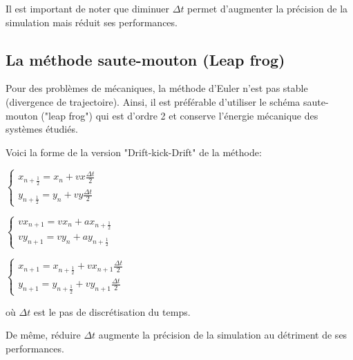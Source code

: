 Il est important de noter que diminuer $\Delta t$ permet d'augmenter la précision de la simulation mais réduit ses performances.

\vspace{2mm}

\subsection{La méthode saute-mouton (Leap frog)}
Pour des problèmes de mécaniques, la méthode d'Euler n'est pas stable (divergence de trajectoire). Ainsi, il est préférable d'utiliser le schéma saute-mouton ("leap frog") qui est d'ordre 2 et conserve l'énergie mécanique des systèmes étudiés.

\vspace{3mm}
Voici la forme de la version "Drift-kick-Drift" de la méthode:
\vspace{2mm}

$
\left\{
    \begin{array}{ll}
        x_{n+\frac{1}{2}} = x_n + vx \frac{\Delta t}{2} \\
        y_{n+\frac{1}{2}} = y_n + vy \frac{\Delta t}{2}
    \end{array}
\right.
$

\vspace{3mm}

$
\left\{
    \begin{array}{ll}
        vx_{n+1} = vx_n + ax_{n+\frac{1}{2}} \\
        vy_{n+1} = vy_n + ay_{n+\frac{1}{2}}
    \end{array}
\right.
$

\vspace{3mm}

$
\left\{
    \begin{array}{ll}
        x_{n+1} = x_{n+\frac{1}{2}} + vx_{n+1}\frac{\Delta t}{2}\\
        y_{n+1} = y_{n+\frac{1}{2}} + vy_{n+1}\frac{\Delta t}{2}
    \end{array}
\right.
$

\vspace{2mm}

où $\Delta t$ est le pas de discrétisation du temps.

De même, réduire $\Delta t$ augmente la précision de la simulation au détriment de ses performances.
